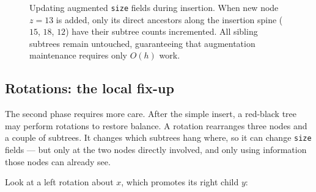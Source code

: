 \begin{figure}[h]
\caption{Updating augmented \texttt{size} fields during insertion. When new node $z=13$ is added, only its direct ancestors along the insertion spine ($15$, $18$, $12$) have their subtree counts incremented. All sibling subtrees remain untouched, guaranteeing that augmentation maintenance requires only $O(h)$ work.}
\label{ch14:fig-os-size-update}
\end{figure}

\subsection{Rotations: the local fix-up}

The second phase requires more care. After the simple insert, a red-black
tree may perform rotations to restore balance. A rotation rearranges three nodes
and a couple of subtrees. It changes which subtrees hang where, so it can change
\texttt{size} fields --- but only at the two nodes directly involved, and only
using information those nodes can already see.

Look at a left rotation about $x$, which promotes its right child $y$:

